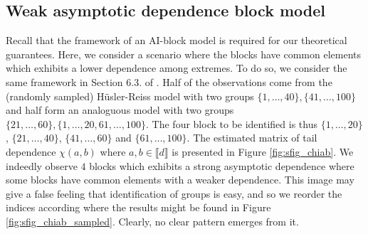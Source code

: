 \documentclass[11pt]{article}
\theoremstyle{definition}
\begin{document}
	
		\subsection{Weak asymptotic dependence block model}
		
		Recall that the framework of an AI-block model is required for our theoretical guarantees. Here, we consider a scenario where the blocks have common elements which exhibits a lower dependence among extremes. To do so, we consider the same framework in Section 6.3. of \cite{fomichov2022spherical}. Half of the observations come from the (randomly sampled) Hüsler-Reiss model with two groups $\{1,\dots,40\}, \{41,\dots, 100\}$ and half form an analoguous model with two groups $\{21,\dots,60\}, \{1,\dots,20,61,\dots,100\}$. The four block to be identified is thus $\{1,\dots,20\}$, $\{21,\dots,40\}$, $\{41,\dots,60\}$ and $\{61,\dots,100\}$. The estimated matrix of tail dependence $\chi(a,b)$ where $a,b \in \llbracket d \rrbracket$ is presented in Figure \ref{fig:sfig_chiab}. We indeedly observe $4$ blocks which exhibits a strong asymptotic dependence where some blocks have common elements with a weaker dependence. This image may give a false feeling that identification of groups is easy, and so we reorder the indices according where the results might be found in Figure \ref{fig:sfig_chiab_sampled}. Clearly, no clear pattern emerges from it.
\end{document}

